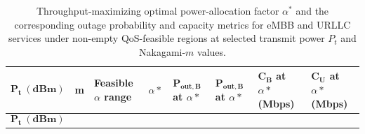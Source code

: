 \documentclass[
]{article}
\begin{document}
\begin{longtable}[]{@{}
  >{\raggedright\arraybackslash}p{}
  >{\raggedright\arraybackslash}p{}
  >{\raggedright\arraybackslash}p{}
  >{\raggedright\arraybackslash}p{}
  >{\raggedright\arraybackslash}p{}
  >{\raggedright\arraybackslash}p{}
  >{\raggedright\arraybackslash}p{}
  >{\raggedright\arraybackslash}p{}@{}}
\caption{Throughput-maximizing optimal power-allocation factor $\alpha^*$ and the corresponding outage probability and capacity metrics for eMBB and URLLC services under non-empty QoS-feasible regions at selected transmit power $P_t$ and Nakagami-$m$ values.}\tabularnewline
\toprule\noalign{}
\begin{minipage}[b]{\linewidth}\raggedright
\[\mathbf{P}_{\mathbf{t}}\mathbf{\ (dBm)}\]
\end{minipage} & \begin{minipage}[b]{\linewidth}\raggedright
m
\end{minipage} & \begin{minipage}[b]{\linewidth}\raggedright
Feasible \(α\) range
\end{minipage} & \begin{minipage}[b]{\linewidth}\raggedright
\(α*\)
\end{minipage} & \begin{minipage}[b]{\linewidth}\raggedright
\(\mathbf{P}_{\mathbf{out,B}}\) at \(α*\)
\end{minipage} & \begin{minipage}[b]{\linewidth}\raggedright
\(\mathbf{P}_{\mathbf{out,B}}\) at \(α*\)
\end{minipage} & \begin{minipage}[b]{\linewidth}\raggedright
\(\mathbf{C}_{\mathbf{B}}\) at \(α*\) (Mbps)
\end{minipage} & \begin{minipage}[b]{\linewidth}\raggedright
\(\mathbf{C}_{\mathbf{U}}\) at \(α*\) (Mbps)
\end{minipage} \\
\midrule\noalign{}
\endfirsthead
\toprule\noalign{}
\begin{minipage}[b]{\linewidth}\raggedright
\[\mathbf{P}_{\mathbf{t}}\mathbf{\ (dBm)}\]
\end{minipage} & \begin{minipage}[b]{\linewidth}\raggedright

\end{minipage}
\end{longtable}
\end{document}

